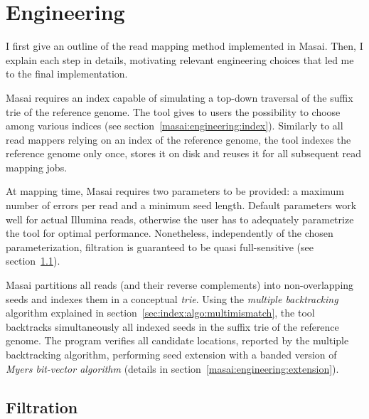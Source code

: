 
\section{Engineering}

I first give an outline of the read mapping method implemented in Masai.
Then, I explain each step in details, motivating relevant engineering choices that led me to the final implementation.

Masai requires an index capable of simulating a top-down traversal of the suffix trie of the reference genome.
The tool gives to users the possibility to choose among various indices (see section~\ref{masai:engineering:index}).
Similarly to all read mappers relying on an index of the reference genome, the tool indexes the reference genome only once, stores it on disk and reuses it for all subsequent read mapping jobs.

At mapping time, Masai requires two parameters to be provided: a maximum number of errors per read and a minimum seed length.
Default parameters work well for actual Illumina reads, otherwise the user has to adequately parametrize the tool for optimal performance.
Nonetheless, independently of the chosen parameterization, filtration is guaranteed to be quasi full-sensitive (see section~\ref{masai:engineering:seeding}).

Masai partitions all reads (and their reverse complements) into non-overlapping seeds and indexes them in a conceptual \emph{trie}.
Using the \emph{multiple backtracking} algorithm explained in section~\ref{sec:index:algo:multimismatch}, the tool backtracks simultaneously all indexed seeds in the suffix trie of the reference genome.
The program verifies all candidate locations, reported by the multiple backtracking algorithm, performing seed extension with a banded version of \emph{Myers bit-vector algorithm} \citep{Myers1999} (details in section~\ref{masai:engineering:extension}).

\subsection{Filtration}
\label{masai:engineering:seeding}


